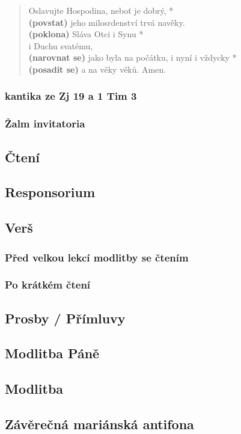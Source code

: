 \begin{quote}
Oslavujte Hospodina, neboť je dobrý, *\\
\textbf{(povstat)} jeho milosrdenství trvá navěky.\\

\textbf{(poklona)} Sláva Otci i Synu *\\
i Duchu svatému,\\

\textbf{(narovnat se)} jako byla na počátku, i nyní i vždycky *\\
\textbf{(posadit se)} a na věky věků. Amen.
\end{quote}


\subsubsection{ kantika ze Zj 19 a 1 Tim 3}
\subsubsection{Žalm invitatoria}

\subsection{Čtení}
\label{sec:cteni}

\subsection{Responsorium}
\label{sec:responsorium}

\subsection{Verš}
\label{sec:vers}
\subsubsection{Před velkou lekcí modlitby se čtením}
\subsubsection{Po krátkém čtení}

\subsection{Prosby / Přímluvy}
\label{sec:prosby}

\subsection{Modlitba Páně}
\label{sec:otcenas}

\subsection{Modlitba}
\label{sec:modlitba}

\subsection{Závěrečná mariánská antifona}
\label{sec:mariaantifona}
